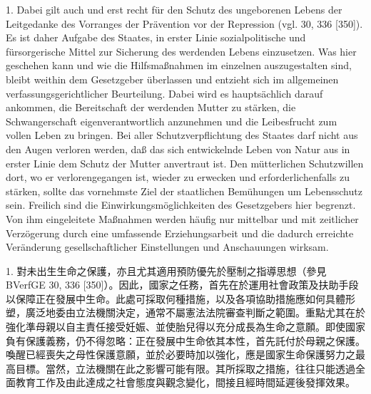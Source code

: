 \documentclass[12pt]{article}
\begin{document}
\syncleft
\begin{sourcepara}
1. Dabei gilt auch und erst recht für den Schutz des ungeborenen Lebens der Leitgedanke des Vorranges der Prävention vor der Repression (vgl. \abbrBVerfGE{} 30, 336 [350]). Es ist daher Aufgabe des Staates, in erster Linie sozialpolitische und fürsorgerische Mittel zur Sicherung des werdenden Lebens einzusetzen. Was hier geschehen kann und wie die Hilfsmaßnahmen im einzelnen auszugestalten sind, bleibt weithin dem Gesetzgeber überlassen und entzieht sich im allgemeinen verfassungsgerichtlicher Beurteilung. Dabei wird es hauptsächlich darauf ankommen, die Bereitschaft der werdenden Mutter zu stärken, die Schwangerschaft eigenverantwortlich anzunehmen und die Leibesfrucht zum vollen Leben zu bringen. Bei aller Schutzverpflichtung des Staates darf nicht aus den Augen verloren werden, daß das sich entwickelnde Leben von Natur aus in erster Linie dem Schutz der Mutter anvertraut ist. Den mütterlichen Schutzwillen dort, wo er verlorengegangen ist, wieder zu erwecken und erforderlichenfalls zu stärken, sollte das vornehmste Ziel der staatlichen Bemühungen um Lebensschutz sein. Freilich sind die Einwirkungsmöglichkeiten des Gesetzgebers hier begrenzt. Von ihm eingeleitete Maßnahmen werden häufig nur mittelbar und mit zeitlicher Verzögerung durch eine umfassende Erziehungsarbeit und die dadurch erreichte Veränderung gesellschaftlicher Einstellungen und Anschauungen wirksam.
\end{sourcepara}
\begin{transpara}
1. 對未出生生命之保護，亦且尤其適用預防優先於壓制之指導思想（參見 BVerfGE 30, 336 [350]）。因此，國家之任務，首先在於運用社會政策及扶助手段以保障正在發展中生命。此處可採取何種措施，以及各項協助措施應如何具體形塑，廣泛地委由立法機關決定，通常不屬憲法法院審查判斷之範圍。重點尤其在於強化準母親以自主責任接受妊娠、並使胎兒得以充分成長為生命之意願。即使國家負有保護義務，仍不得忽略：正在發展中生命依其本性，首先託付於母親之保護。喚醒已經喪失之母性保護意願，並於必要時加以強化，應是國家生命保護努力之最高目標。當然，立法機關在此之影響可能有限。其所採取之措施，往往只能透過全面教育工作及由此達成之社會態度與觀念變化，間接且經時間延遲後發揮效果。
\end{transpara}
\end{document}
